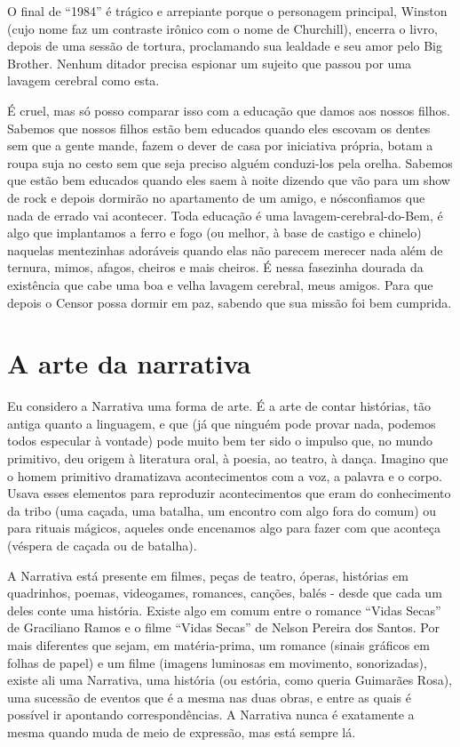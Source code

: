 O final de “1984” é trágico e arrepiante porque o personagem
principal, Winston (cujo nome faz um contraste irônico com o nome de
Churchill), encerra o livro, depois de uma sessão de tortura,
proclamando sua lealdade e seu amor pelo Big Brother. Nenhum ditador
precisa espionar um sujeito que passou por uma lavagem cerebral como
esta.

É cruel, mas só posso comparar isso com a educação que damos aos
nossos filhos. Sabemos que nossos filhos estão bem educados quando
eles escovam os dentes sem que a gente mande, fazem o dever de casa
por iniciativa própria, botam a roupa suja no cesto sem que seja
preciso alguém conduzi-los pela orelha. Sabemos que estão bem
educados quando eles saem à noite dizendo que vão para um show de
rock e depois dormirão no apartamento de um amigo, e nósconfiamos que
nada de errado vai acontecer. Toda educação é uma
lavagem-cerebral-do-Bem, é algo que implantamos a ferro e fogo (ou
melhor, à base de castigo e chinelo) naquelas mentezinhas adoráveis
quando elas não parecem merecer nada além de ternura, mimos, afagos,
cheiros e mais cheiros. É nessa fasezinha dourada da existência que
cabe uma boa e velha lavagem cerebral, meus amigos. Para que depois o
Censor possa dormir em paz, sabendo que sua missão foi bem cumprida.

\chapter{A arte da narrativa}

Eu considero a Narrativa uma forma de arte. É a arte de contar
histórias, tão antiga quanto a linguagem, e que (já que ninguém pode
provar nada, podemos todos especular à vontade) pode muito bem ter
sido o impulso que, no mundo primitivo, deu origem à literatura oral,
à poesia, ao teatro, à dança. Imagino que o homem primitivo
dramatizava acontecimentos com a voz, a palavra e o corpo.  Usava
esses elementos para reproduzir acontecimentos que eram do
conhecimento da tribo (uma caçada, uma batalha, um encontro com algo
fora do comum) ou para rituais mágicos, aqueles onde encenamos algo
para fazer com que aconteça (véspera de caçada ou de batalha).

A Narrativa está presente em filmes, peças de teatro, óperas,
histórias em quadrinhos, poemas, videogames, romances, canções, balés
- desde que cada um deles conte uma história. Existe algo em comum
entre o romance “Vidas Secas” de Graciliano Ramos e o filme “Vidas
Secas” de Nelson Pereira dos Santos. Por mais diferentes que sejam,
em matéria-prima, um romance (sinais gráficos em folhas de papel) e
um filme (imagens luminosas em movimento, sonorizadas), existe ali
uma Narrativa, uma história (ou estória, como queria Guimarães Rosa),
uma sucessão de eventos que é a mesma nas duas obras, e entre as
quais é possível ir apontando correspondências. A Narrativa nunca é
exatamente a mesma quando muda de meio de expressão, mas está sempre
lá.

